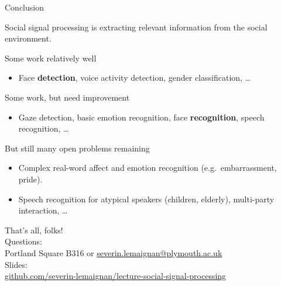 \documentclass[compress]{beamer}
\begin{document}
\begin{frame}{Conclusion}

Social signal processing is extracting relevant information from the
social environment.

Some work relatively well

\begin{itemize}

\item Face \textbf{detection}, voice activity detection, gender
  classification, \ldots{}
\end{itemize}

Some work, but need improvement

\begin{itemize}

\item Gaze detection, basic emotion recognition, face \textbf{recognition},
  speech recognition, \ldots{}
\end{itemize}

But still many open problems remaining

\begin{itemize}

\item Complex real-word affect and emotion recognition (e.g.~embarrassment,
  pride).
\item Speech recognition for atypical speakers (children, elderly),
  multi-party interaction, \ldots{}
\end{itemize}

\end{frame}


\begin{frame}{}
    \begin{center}
        \Large
        That's all, folks!\\[2em]
        \normalsize
        Questions:\\
        Portland Square B316 or \url{severin.lemaignan@plymouth.ac.uk} \\[1em]

        Slides:\\ \href{https://github.com/severin-lemaignan/lecture-social-signal-processing}{\small github.com/severin-lemaignan/lecture-social-signal-processing}

    \end{center}
\end{frame}
\end{document}
